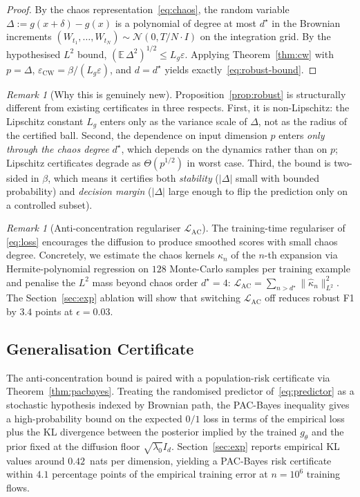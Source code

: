 \documentclass[journal,10pt]{IEEEtran}
\theoremstyle{definition}
\theoremstyle{remark}
\newtheorem{remark}[theorem]{Remark}
\newcommand{\Exp}{\mathbb{E}}
\newcommand{\Ncal}{\mathcal{N}}
\newcommand{\Lcal}{\mathcal{L}}
\begin{document}
\begin{proof}
By the chaos representation~\eqref{eq:chaos}, the random variable
$\Delta := g(x+\delta)-g(x)$ is a polynomial of degree at most
$d^\star$ in the Brownian increments
$(W_{t_1},\dots,W_{t_N})\sim\Ncal(0,T/N\cdot I)$ on the integration grid.
By the hypothesised $L^2$ bound, $(\Exp\,\Delta^2)^{1/2}\leq L_g\varepsilon$.
Applying Theorem~\ref{thm:cw} with $p=\Delta$,
$\varepsilon_{\mathrm{CW}}=\beta/(L_g\varepsilon)$, and $d=d^\star$
yields exactly~\eqref{eq:robust-bound}.
\end{proof}

\begin{remark}[Why this is genuinely new]
Proposition~\ref{prop:robust} is structurally different from existing
certificates in three respects. First, it is non-Lipschitz: the
Lipschitz constant $L_g$ enters only as the variance scale of $\Delta$,
not as the radius of the certified ball. Second, the dependence on
input dimension $p$ enters \emph{only through the chaos degree}
$d^\star$, which depends on the dynamics rather than on $p$;
Lipschitz certificates degrade as $\Theta(p^{1/2})$ in worst case.
Third, the bound is two-sided in $\beta$, which means it certifies
both \emph{stability} ($|\Delta|$ small with bounded probability) and
\emph{decision margin} ($|\Delta|$ large enough to flip the prediction
only on a controlled subset).
\end{remark}

\begin{remark}[Anti-concentration regulariser $\Lcal_\mathrm{AC}$]
The training-time regulariser of \eqref{eq:loss} encourages the
diffusion to produce smoothed scores with small chaos degree.
Concretely, we estimate the chaos kernels $\kappa_n$ of the
$n$-th expansion via Hermite-polynomial regression on $128$ Monte-Carlo
samples per training example and penalise the $L^2$ mass beyond chaos
order $d^\star=4$:
$\Lcal_\mathrm{AC}=\sum_{n>d^\star}\|\hat\kappa_n\|_{L^2}^2$.
The Section~\ref{sec:exp} ablation will show that switching
$\Lcal_\mathrm{AC}$ off reduces robust F1 by $3.4$ points at
$\epsilon=0.03$.
\end{remark}

\subsection{Generalisation Certificate}
The anti-concentration bound is paired with a population-risk
certificate via Theorem~\ref{thm:pacbayes}. Treating the
randomised predictor of~\eqref{eq:predictor} as a stochastic
hypothesis indexed by Brownian path, the PAC-Bayes inequality
gives a high-probability bound on the expected $0/1$ loss in terms
of the empirical loss plus the KL divergence between the posterior
implied by the trained $g_\theta$ and the prior fixed at the
diffusion floor $\sqrt{\lambda_0}I_d$. Section~\ref{sec:exp} reports
empirical KL values around $0.42$~nats per dimension, yielding a
PAC-Bayes risk certificate within $4.1$ percentage points of the
empirical training error at $n=10^{6}$ training flows.
\end{document}
